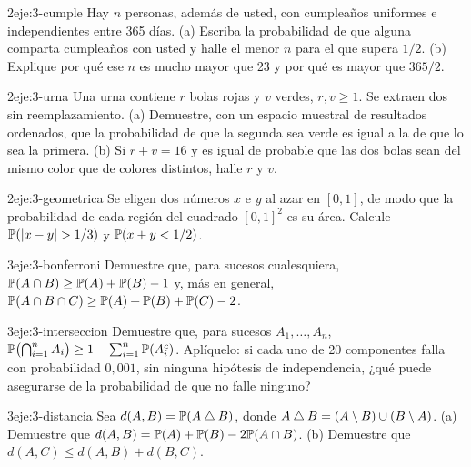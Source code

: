 \begin{ejercicio}{2}{eje:3-cumple}
Hay $n$ personas, además de usted, con cumpleaños uniformes e independientes entre 365 días. (a) Escriba la probabilidad de que alguna comparta cumpleaños con usted y halle el menor $n$ para el que supera $1/2$. (b) Explique por qué ese $n$ es mucho mayor que 23 y por qué es mayor que $365/2$.
\end{ejercicio}

\begin{ejercicio}{2}{eje:3-urna}
Una urna contiene $r$ bolas rojas y $v$ verdes, $r,v\ge1$. Se extraen dos sin reemplazamiento. (a) Demuestre, con un espacio muestral de resultados ordenados, que la probabilidad de que la segunda sea verde es igual a la de que lo sea la primera. (b) Si $r+v=16$ y es igual de probable que las dos bolas sean del mismo color que de colores distintos, halle $r$ y $v$.
\end{ejercicio}

\begin{ejercicio}{2}{eje:3-geometrica}
Se eligen dos números $x$ e $y$ al azar en $[0,1]$, de modo que la probabilidad de cada región del cuadrado $[0,1]^{2}$ es su área. Calcule $\mathbb{P}(\lvert x-y\rvert>1/3)$ y $\mathbb{P}(x+y<1/2)$.
\end{ejercicio}

\begin{ejercicio}{3}{eje:3-bonferroni}
Demuestre que, para sucesos cualesquiera, $\mathbb{P}(A\cap B)\ge\mathbb{P}(A)+\mathbb{P}(B)-1$ y, más en general, $\mathbb{P}(A\cap B\cap C)\ge\mathbb{P}(A)+\mathbb{P}(B)+\mathbb{P}(C)-2$.
\end{ejercicio}

\begin{ejercicio}{3}{eje:3-interseccion}
Demuestre que, para sucesos $A_1,\dots,A_n$, $\mathbb{P}\bigl(\bigcap_{i=1}^{n}A_i\bigr)\ge1-\sum_{i=1}^{n}\mathbb{P}(A_i^{c})$. Aplíquelo: si cada uno de 20 componentes falla con probabilidad $0{,}001$, sin ninguna hipótesis de independencia, ¿qué puede asegurarse de la probabilidad de que no falle ninguno?
\end{ejercicio}

\begin{ejercicio}{3}{eje:3-distancia}
Sea $d(A,B)=\mathbb{P}(A\mathbin{\triangle} B)$, donde $A\mathbin{\triangle} B=(A\setminus B)\cup(B\setminus A)$. (a) Demuestre que $d(A,B)=\mathbb{P}(A)+\mathbb{P}(B)-2\mathbb{P}(A\cap B)$. (b) Demuestre que $d(A,C)\le d(A,B)+d(B,C)$.
\end{ejercicio}

